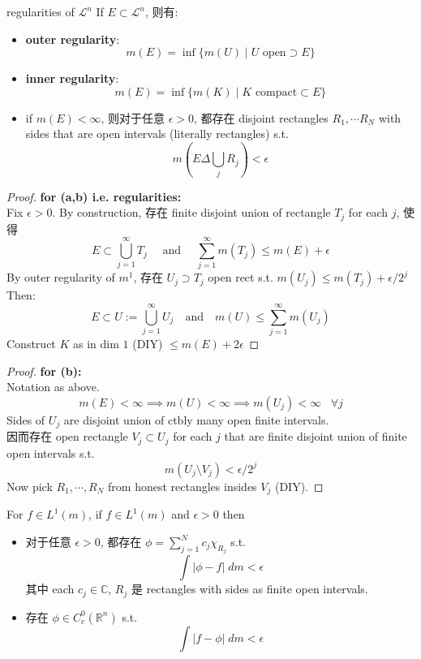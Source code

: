 \documentclass[lang=cn,11pt]{elegantbook}
\begin{document}
\begin{theorem}{regularities of $\mathcal{L}^n$}
If $E \subset \mathcal{L}^n$, 则有: 
\begin{itemize}
    \item \textbf{outer regularity}: \[ m(E) = \inf \{  m(U) \mid U  \text{ open}   \supset E\}  \]
    \item \textbf{inner regularity}: \[ m(E) = \inf \{  m(K) \mid K  \text{ compact}   \subset E\}  \]
    \item if $m(E) < \infty$, 则对于任意 $\epsilon > 0$, 都存在 disjoint rectangles $R_1, \cdots R_N$ with sides that are open intervals (literally rectangles) s.t. \[ m(E  \Delta \bigcup_{j} R_j ) < \epsilon \]
\end{itemize}
\end{theorem}
\begin{proof}
 \textbf{   for (a,b) i.e. regularities: }\\
 Fix $\epsilon > 0 $. By construction, 存在 finite disjoint union of rectangle $T_j$ for each $j$, 使得 \[
 E \subset \bigcup_{j=1}^\infty T_j \quad \text{ and } \quad \sum_{j=1}^\infty m(T_j) \leq m(E) + \epsilon
 \]
By outer regularity of $m^1$, 存在 $U_j \supset T_j$ open rect s.t. $m(U_j) \leq m(T_j) + \epsilon / 2^j$
Then: \[
E \subset U := \bigcup_{j=1}^\infty U_j \quad \text{and} \quad m(U) \leq \sum_{j=1}^\infty m(U_j)
\]
Construct $K$ as in dim $1$ (DIY) $\leq m(E) + 2\epsilon$
\end{proof}
\begin{proof}
 \textbf{   for (b):} \\
Notation as above.\\
\[
m(E) < \infty \implies m(U) < \infty \implies m(U_j)  < \infty \;\; \; \forall j
\]
Sides of $U_j$ are disjoint union of ctbly many open finite intervals.\\
因而存在 open rectangle $V_j \subset U_j$ for each $j$ that are finite disjoint union of finite open intervals s.t. \[
m(U_j  \setminus   V_j) < \epsilon / 2^j
\]
Now pick $R_1, \cdots, R_N$ from honest rectangles insides $V_j$ (DIY).
\end{proof}




\begin{corollary}
For $f \in L^1(m)$, 
    if $f \in L^1 (m)$ and $\epsilon > 0$ then \begin{itemize}
        \item 对于任意 $\epsilon>0$, 都存在 $\phi = \sum_{j=1}^N c_j \chi_{R_j} $ s.t. \[\int |\phi - f|\; dm < \epsilon  \]其中 each $c_j \in \mathbb{C}$, $R_j$ 是 rectangles with sides as finite open intervals.
        \item 存在 $\phi \in C_c^0(\mathbb{R}^n)$ s.t. \[\int |f - \phi| \; dm < \epsilon \]
    \end{itemize}
\end{corollary}
\end{document}
